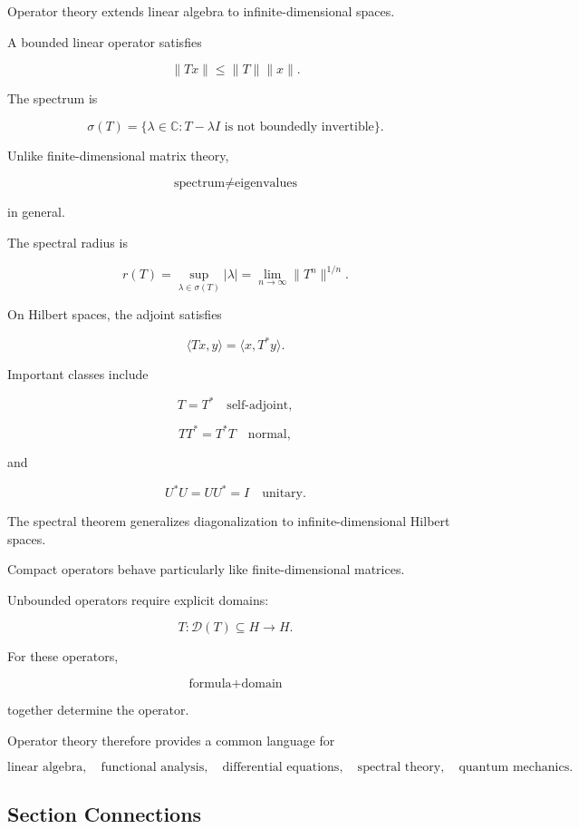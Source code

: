 Operator theory extends linear algebra to infinite-dimensional spaces.

A bounded linear operator satisfies

\[
\boxed{
\|Tx\|
\leq
\|T\|\|x\|.
}
\]

The spectrum is

\[
\boxed{
\sigma(T)
=
\{
\lambda\in\mathbb{C}:
T-\lambda I
\text{ is not boundedly invertible}
\}.
}
\]

Unlike finite-dimensional matrix theory,

\[
\boxed{
\text{spectrum}
\neq
\text{eigenvalues}
}
\]

in general.

The spectral radius is

\[
\boxed{
r(T)
=
\sup_{\lambda\in\sigma(T)}|\lambda|
=
\lim_{n\to\infty}\|T^n\|^{1/n}.
}
\]

On Hilbert spaces, the adjoint satisfies

\[
\boxed{
\langle Tx,y\rangle
=
\langle x,T^*y\rangle.
}
\]

Important classes include

\[
\boxed{
T=T^*
\quad
\text{self-adjoint},
}
\]

\[
\boxed{
TT^*=T^*T
\quad
\text{normal},
}
\]

and

\[
\boxed{
U^*U=UU^*=I
\quad
\text{unitary}.
}
\]

The spectral theorem generalizes diagonalization to infinite-dimensional
Hilbert spaces.

Compact operators behave particularly like finite-dimensional matrices.

Unbounded operators require explicit domains:

\[
\boxed{
T:\mathcal{D}(T)\subseteq H\to H.
}
\]

For these operators,

\[
\boxed{
\text{formula}
+
\text{domain}
}
\]

together determine the operator.

Operator theory therefore provides a common language for

\[
\boxed{
\text{linear algebra},
\quad
\text{functional analysis},
\quad
\text{differential equations},
\quad
\text{spectral theory},
\quad
\text{quantum mechanics}.
}
\]

\subsection{Section Connections}
\label{subsec:operator-theory-connections}

